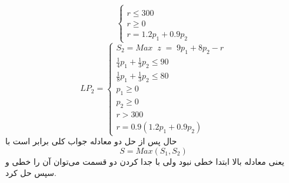 \documentclass[12pt]{article}
\begin{document}
\begin{enumerate}[(a)]
\begin{equation}
\begin{cases}
			\\
			r\leq 300
			\\
			r\geq 0
			\\
			r=1.2p_1+0.9p_2
		\end{cases}       
	\end{equation}
	\begin{equation}
		LP_2=
		\begin{cases}
			S_2=Max \; \; z\;= \; 9p_1+8p_2-r
			\\
			\frac{1}{4} p_1 + \frac{1}{3} p_2  \leq  90
			\\
			\frac{1}{8} p_1 + \frac{1}{3} p_2  \leq  80 
			\\
			p_1\geq 0
			\\
			p_2\geq 0
			\\
			r> 300
			\\
			r=0.9(1.2p_1+0.9p_2)
		\end{cases}       
	\end{equation}
	حال پس از حل دو معادله جواب کلی برابر است با
	\begin{equation}
		S=Max(S_1,S_2)
	\end{equation}
	یعنی معادله بالا ابتدا خطی نبود ولی با جدا کردن دو قسمت می‌توان آن را خطی و سپس حل کرد.
	
\end{enumerate}
\end{document}
